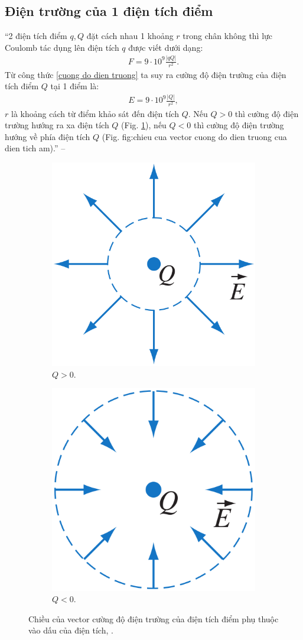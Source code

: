 \documentclass[oneside]{book}
\numberwithin{equation}{section}
\begin{document}
\subsection{Điện trường của 1 điện tích điểm}
``2 điện tích điểm $q,Q$ đặt cách nhau 1 khoảng $r$ trong chân không thì lực Coulomb tác dụng lên điện tích $q$ được viết dưới dạng:
\begin{align*}
	F = 9\cdot 10^9\frac{|qQ|}{r^2}.
\end{align*}
Từ công thức \eqref{cuong do dien truong} ta suy ra cường độ điện trường của điện tích điểm $Q$ tại 1 điểm là:
\begin{align}
	\label{cuong do dien truong 2}
	E = 9\cdot 10^9\frac{|Q|}{r^2},
\end{align}
$r$ là khoảng cách từ điểm khảo sát đến điện tích $Q$. Nếu $Q > 0$ thì cường độ điện trường hướng ra xa điện tích $Q$ (Fig. \ref{fig:chieu cua vector cuong do dien truong cua dien tich duong}), nếu $Q < 0$ thì cường độ điện trường hướng về phía điện tích $Q$ (Fig. {fig:chieu cua vector cuong do dien truong cua dien tich am}).'' -- \cite[pp. 16--17]{SGK_Vat_Ly_11_nang_cao}

\begin{figure}
	\centering
	\begin{subfigure}{.5\textwidth}
		\centering
		\includegraphics[width=.4\linewidth]{chieu_cua_vector_cuong_do_dien_truong_cua_dien_tich_diem_duong}
		\caption{$Q > 0$.}
		\label{fig:chieu cua vector cuong do dien truong cua dien tich duong}
	\end{subfigure}%
	\begin{subfigure}{.5\textwidth}
		\centering
		\includegraphics[width=.4\linewidth]{chieu_cua_vector_cuong_do_dien_truong_cua_dien_tich_diem_am}
		\caption{$Q < 0$.}
		\label{fig:chieu cua vector cuong do dien truong cua dien tich am}
	\end{subfigure}
	\caption{Chiều của vector cường độ điện trường của điện tích điểm phụ thuộc vào dấu của điện tích, \cite[Hình 3.9, p. 17]{SGK_Vat_Ly_11_nang_cao}.}
	\label{fig:chieu cua vector cuong do dien truong cua dien tich}
\end{figure}
\end{document}
